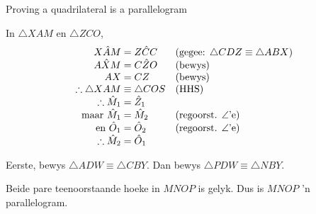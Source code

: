 \begin{wex}{Proving a quadrilateral is a parallelogram}
{In $\triangle XAM$ en $\triangle ZCO$, \\
\begin{equation*}
 \begin{array}{r@{\;}l@{\quad}l}
X\hat{A}M &= Z\hat{C}C & \mbox{(gegee: } \triangle CDZ \equiv \triangle ABX) \\
A\hat{X}M &= C\hat{Z}O & \mbox{(bewys)} \\
AX &= CZ & \mbox{(bewys)} \\
\therefore \triangle XAM &\equiv \triangle COS & \mbox{(HHS)} \\
\therefore \hat{M}_{1} &= \hat{Z}_{1} & \\
\mbox{maar }\hat{M}_1 &= \hat{M}_2 & \mbox{(regoorst. $\angle$'e)} \\
\mbox{en }\hat{O}_{1} &= \hat{O}_2 & \mbox{(regoorst. $\angle$'e)} \\
\therefore \hat{M}_2 &= \hat{O}_{1} & 
 \end{array}
\end{equation*}


  Eerste, bewys $\triangle ADW \equiv \triangle CBY$. Dan bewys $\triangle
  PDW \equiv \triangle NBY$.

Beide pare teenoorstaande hoeke in $MNOP$ is gelyk. Dus is $MNOP$  'n parallelogram.
}
\end{wex}


